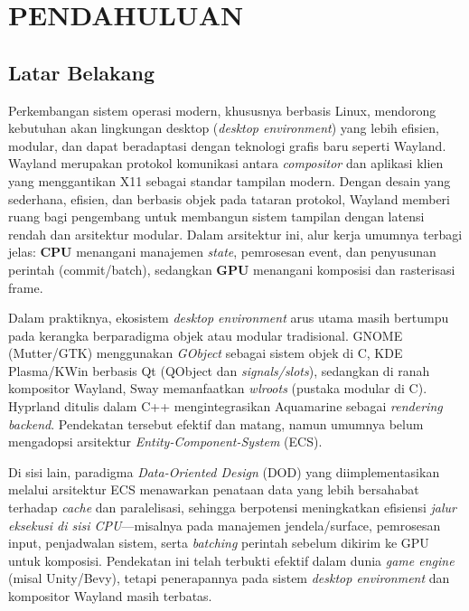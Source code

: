 \newpage
\chapter{PENDAHULUAN} \label{Bab I}

\section{Latar Belakang} \label{I.Latar Belakang}
Perkembangan sistem operasi modern, khususnya berbasis Linux, mendorong kebutuhan akan lingkungan desktop (\textit{desktop environment}) yang lebih efisien, modular, dan dapat beradaptasi dengan teknologi grafis baru seperti Wayland. Wayland merupakan protokol komunikasi antara \textit{compositor} dan aplikasi klien yang menggantikan X11 sebagai standar tampilan modern. Dengan desain yang sederhana, efisien, dan berbasis objek pada tataran protokol, Wayland memberi ruang bagi pengembang untuk membangun sistem tampilan dengan latensi rendah dan arsitektur modular. Dalam arsitektur ini, alur kerja umumnya terbagi jelas: \textbf{CPU} menangani manajemen \textit{state}, pemrosesan event, dan penyusunan perintah (commit/batch), sedangkan \textbf{GPU} menangani komposisi dan rasterisasi frame. \par

Dalam praktiknya, ekosistem \textit{desktop environment} arus utama masih bertumpu pada kerangka berparadigma objek atau modular tradisional. GNOME (Mutter/GTK) menggunakan \textit{GObject} sebagai sistem objek di C, KDE Plasma/KWin berbasis Qt (QObject dan \textit{signals/slots}), sedangkan di ranah kompositor Wayland, Sway memanfaatkan \textit{wlroots} (pustaka modular di C). Hyprland ditulis dalam C++ mengintegrasikan Aquamarine sebagai \textit{rendering backend}. Pendekatan tersebut efektif dan matang, namun umumnya belum mengadopsi arsitektur \textit{Entity-Component-System} (ECS). \par

Di sisi lain, paradigma \textit{Data-Oriented Design} (DOD) yang diimplementasikan melalui arsitektur ECS menawarkan penataan data yang lebih bersahabat terhadap \textit{cache} dan paralelisasi, sehingga berpotensi meningkatkan efisiensi \textit{jalur eksekusi di sisi CPU}—misalnya pada manajemen jendela/surface, pemrosesan input, penjadwalan sistem, serta \textit{batching} perintah sebelum dikirim ke GPU untuk komposisi. Pendekatan ini telah terbukti efektif dalam dunia \textit{game engine} (misal Unity/Bevy), tetapi penerapannya pada sistem \textit{desktop environment} dan kompositor Wayland masih terbatas. \par

